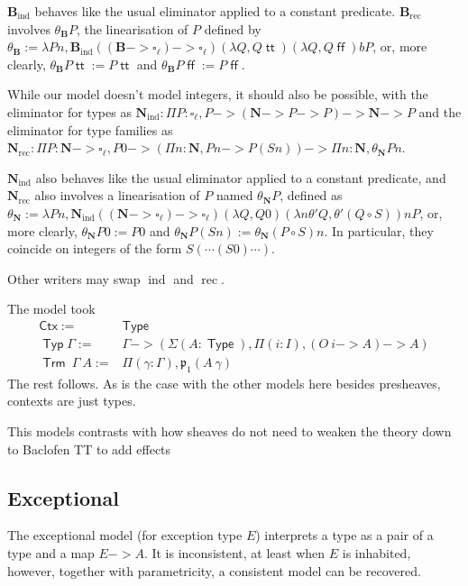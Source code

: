 \documentclass[11pt]{article}
\DeclareMathOperator{\Type}{\mathsf{Type}}
\DeclareMathOperator{\rec}{rec}
\DeclareMathOperator{\ind}{ind}
\DeclareMathOperator{\Typ}{\mathsf{Typ}}
\DeclareMathOperator{\Trm}{\mathsf{Trm}}
\DeclareMathOperator{\true}{\mathsf{tt}}
\DeclareMathOperator{\false}{\mathsf{ff}}
\newcommand{\0}{\mathbf{0}}
\newcommand{\1}{\mathbf{1}}
\newcommand{\nat}{\mathbf{N}}
\newcommand{\bool}{\mathbf{B}}
\begin{document}
$\bool_{\ind}$ behaves like the usual eliminator applied to a constant predicate. $\bool_{\rec}$ involves $\theta_\bool P$, the linearisation of $P$ defined by $\theta_\bool:= \lambda P n, \bool_{\ind} ((\bool ->\square_\ell) -> \square_\ell) (\lambda Q, Q \true) (\lambda Q, Q \false) b P$, or, more clearly, $\theta_\bool P \true := P \true$ and $\theta_\bool P \false :=  P \false$.


While our model doesn't model integers, it should also be possible, with the eliminator for types as $\nat_{\ind} : \Pi P : \square_\ell, P -> (\nat ->P -> P) -> \nat -> P $ and the eliminator for type families as $\nat_{\rec} : \Pi P : \nat -> \square_\ell, P 0 -> (\Pi n :\nat, P n -> P (S n)) -> \Pi n : \nat, \theta_\nat P n$.

$\nat_{\ind}$ also behaves like the usual eliminator applied to a constant predicate, and $\nat_{\rec}$ also involves a linearisation of $P$ named $\theta_\nat P$, defined as $\theta_\nat:= \lambda P n, \nat_{\ind} ((\nat ->\square_\ell) -> \square_\ell) (\lambda Q, Q 0) (\lambda n \theta' Q, \theta' (Q\circ S)) n P$, or, more clearly, $\theta_\nat P 0 := P 0$ and $\theta_\nat P (S n) := \theta_\nat (P\circ S) n$. In particular, they coincide on  integers of the form $S(\cdots (S 0)\cdots)$.

Other writers may swap $\ind$ and $\rec$.

The model took
$$
    \begin{array}{rl}
        \mathsf{Ctx} :=& \Type\\
        \Typ\Gamma :=&\Gamma -> (\Sigma (A : \Type), \Pi(i:I), (O\ i-> A)->A)\\
        \Trm\ \Gamma\ A := & \Pi (\gamma:\Gamma), \mathfrak{p}_1 (A\ \gamma)
    \end{array}
$$
The rest follows. As is the case with the other models here besides presheaves, contexts are just types.

This models contrasts with how sheaves do not need to weaken the theory down to Baclofen TT to add effects

\subsection{Exceptional}

The exceptional model (for exception type $E$) interprets a type as a pair of a type and a map $E -> A$. It is inconsistent, at least when $E$ is inhabited, however, together with parametricity, a consistent model can be recovered.
\end{document}

